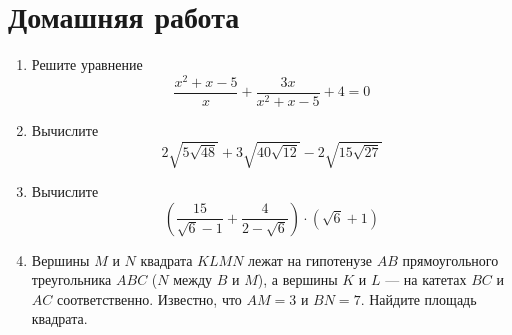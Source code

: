 \documentclass[12pt, a5paper]{article}
\begin{document}
	
	
	\section*{Домашняя работа}
	\begin{enumerate}
		\item Решите уравнение $$\dfrac{x^2+x-5}{x}+\dfrac{3x}{x^2+x-5}+4=0$$
		\item Вычислите $$2\sqrt{5\sqrt{48}}+3\sqrt{40\sqrt{12}}-2\sqrt{15\sqrt{27}}$$
		\item Вычислите $$\left(\dfrac{15}{\sqrt{6}-1}+\dfrac{4}{2-\sqrt{6}}\right)\cdot(\sqrt{6}+1)$$
		\item Вершины $M$ и $N$ квадрата $KLMN$ лежат на гипотенузе $AB$ прямоугольного треугольника $ABC$ ($N$ между $B$ и $M$), а вершины $K$ и $L$ —
		на катетах $BC$ и $AC$ соответственно. Известно, что $AM =3$ и $BN =7$. Найдите площадь квадрата.
	\end{enumerate}
\end{document}
